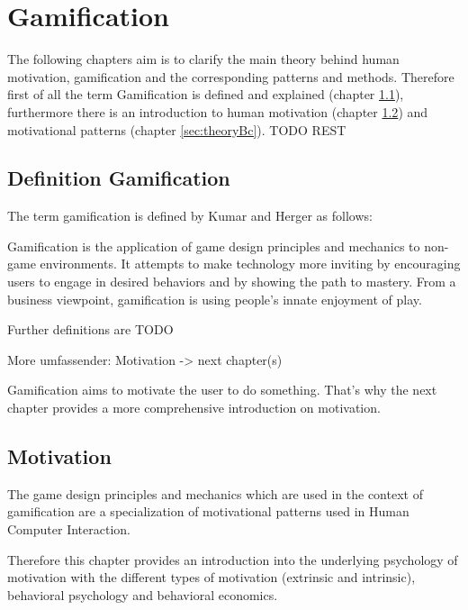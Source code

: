 \newpage
\section{Gamification}
\label{sec:theoryB}

The following chapters aim is to clarify the main theory behind human motivation, gamification and the corresponding patterns and methods. Therefore first of all the term Gamification is defined and explained (chapter \ref{sec:theoryBa}), furthermore there is an introduction to human motivation (chapter \ref{sec:theoryBb}) and motivational patterns (chapter \ref{sec:theoryBc}). TODO REST

\subsection{Definition Gamification}
\label{sec:theoryBa}

The term gamification is defined by Kumar and Herger as follows:

\begin{fquote}
	Gamification is the application of game design principles and mechanics to
	non-game environments. It attempts to make technology more inviting by encouraging users to engage in desired behaviors and by showing the path to mastery.
	From a business viewpoint, gamification is using people’s innate enjoyment of play.
\end{fquote}

Further definitions are TODO

\cite[p. 8]{inproceedings}

More umfassender: Motivation -> next chapter(s)

Gamification aims to motivate the user to do something. That's why the next chapter provides a more comprehensive introduction on motivation.

\subsection{Motivation}
\label{sec:theoryBb}

The game design principles and mechanics which are used in the context of gamification are a specialization of motivational patterns used in Human Computer Interaction. \cite[p. 59]{inproceedings}

Therefore this chapter provides an introduction into the underlying psychology of motivation with the different types of motivation (extrinsic and intrinsic), behavioral psychology and behavioral economics.

